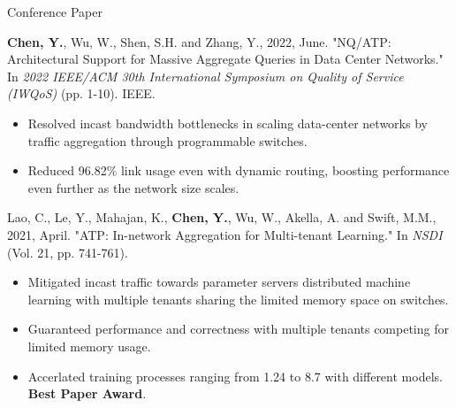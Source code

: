 
\vspace{-2mm}

\begin{cventries}

  \cventry
    {} %
    {Conference Paper} %
    {} %
    {} %
    {
      \vspace{-2mm}
      \begin{cvitems} %
        \item {\textbf{Chen, Y.}, Wu, W., Shen, S.H. and Zhang, Y., 2022, June. "NQ/ATP: Architectural Support for Massive Aggregate Queries in Data Center Networks." 
        In \emph{2022 IEEE/ACM 30th International Symposium on Quality of Service (IWQoS)} (pp. 1-10). IEEE.
        }
        \begin{itemize}
          \item {Resolved incast bandwidth bottlenecks in scaling data-center networks by traffic aggregation through programmable switches.}
          \item {Reduced 96.82\% link usage even with dynamic routing, boosting performance even further as the network size scales.}
        \end{itemize}
        \item {Lao, C., Le, Y., Mahajan, K., \textbf{Chen, Y.}, Wu, W., Akella, A. and Swift, M.M., 2021, April. "ATP: In-network Aggregation for Multi-tenant Learning." 
        In \emph{NSDI} (Vol. 21, pp. 741-761).
        }
        \begin{itemize}
          \item{Mitigated incast traffic towards parameter servers distributed machine learning with multiple tenants sharing the limited memory space on switches.}
          \item {Guaranteed performance and correctness with multiple tenants competing for limited memory usage.}
          \item {Accerlated training processes ranging from 1.24 to 8.7 with different models. \textbf{Best Paper Award}.}
        \end{itemize}
      \end{cvitems}
    }
  \vspace{-2mm}


\end{cventries}
